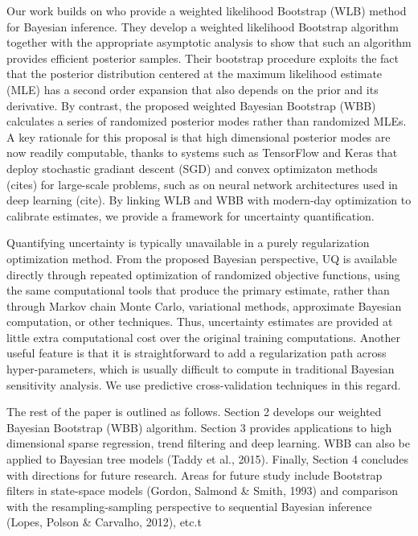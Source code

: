 \documentclass[12pt]{TD-CJS}
\begin{document}
Our work builds on \cite{newton1994approximate} who provide a weighted likelihood Bootstrap (WLB) method for Bayesian inference. They develop a weighted likelihood Bootstrap algorithm together with the appropriate asymptotic analysis to show that such an algorithm 
provides efficient posterior samples. Their bootstrap procedure exploits the fact that the posterior distribution centered at the maximum likelihood estimate (MLE) has a second order expansion that also depends on the prior
and its derivative. By contrast, the proposed weighted Bayesian Bootstrap (WBB) calculates a series of
randomized  posterior modes rather than randomized MLEs. A key rationale for this proposal is  that 
high dimensional posterior modes are now readily computable, thanks to systems such as TensorFlow and Keras
that deploy stochastic gradiant descent (SGD) and convex optimizaton methods (cites) for large-scale
problems, such as on neural network architectures used in deep learning (cite).
By linking WLB and WBB with modern-day optimization to calibrate estimates, we provide a framework for uncertainty quantification.

Quantifying uncertainty is typically unavailable in a purely regularization optimization method. 
From the proposed Bayesian perspective, UQ is 
available directly through repeated optimization of randomized objective functions, using the same
computational tools that produce the primary estimate,  rather than through Markov
chain Monte Carlo, variational methods,  approximate Bayesian computation, or other techniques. 
Thus, uncertainty estimates are provided at little extra computational cost over the original
training computations.  Another useful feature is that  it is straightforward to add a regularization path across hyper-parameters, which is usually difficult to compute in traditional Bayesian
sensitivity analysis.  We use predictive cross-validation techniques in this regard.

The rest of the paper is outlined as follows. Section 2 develops our weighted Bayesian Bootstrap (WBB) algorithm. Section 3 provides applications to high dimensional sparse regression, trend filtering and deep learning. WBB can also be applied to Bayesian tree models (Taddy et al., 2015). Finally, Section 4 concludes with directions for future research. Areas for future study include Bootstrap filters in state-space models (Gordon{,}  Salmond \& Smith, 1993)  and comparison with the resampling-sampling
perspective to sequential Bayesian inference (Lopes, Polson \& Carvalho, 2012), etc.t
\end{document}
